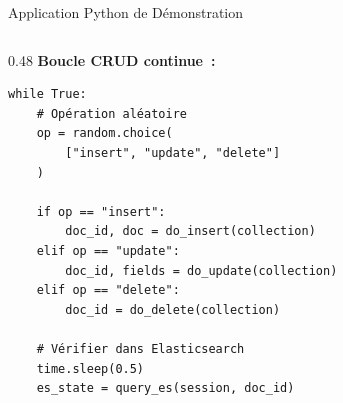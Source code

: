 \documentclass[aspectratio=169]{beamer}
\begin{document}
\begin{frame}[fragile]{Application Python de Démonstration}
  \begin{columns}[T]
    \begin{column}{0.48\textwidth}
      \textbf{\color{accent} Boucle CRUD continue~:}
      \begin{tcolorbox}[codebox]
\begin{verbatim}
while True:
    # Opération aléatoire
    op = random.choice(
        ["insert", "update", "delete"]
    )

    if op == "insert":
        doc_id, doc = do_insert(collection)
    elif op == "update":
        doc_id, fields = do_update(collection)
    elif op == "delete":
        doc_id = do_delete(collection)

    # Vérifier dans Elasticsearch
    time.sleep(0.5)
    es_state = query_es(session, doc_id)


\end{verbatim}
\end{tcolorbox}
\end{column}
\end{columns}
\end{frame}
\end{document}
